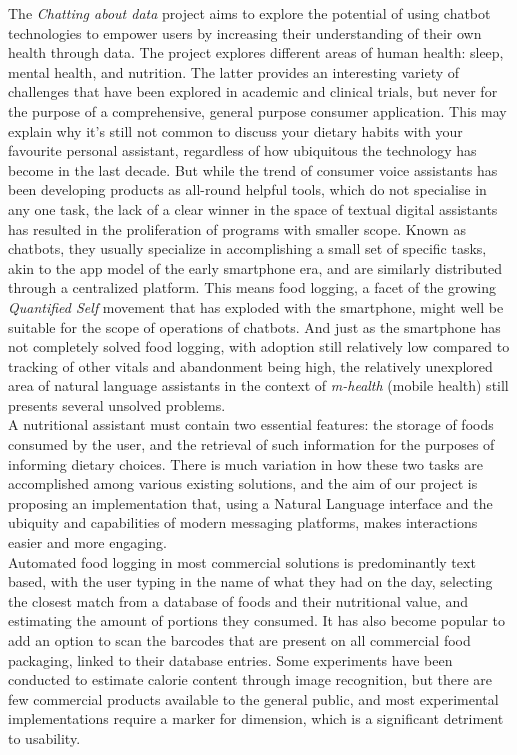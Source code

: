 The \textit{Chatting about data} project aims to explore the potential of using chatbot technologies to empower users by increasing their understanding of their own health through data. The project explores different areas of human health: sleep, mental health, and nutrition. The latter provides an interesting variety of challenges that have been explored in academic and clinical trials, but never for the purpose of a comprehensive, general purpose consumer application. This may explain why it’s still not common to discuss your dietary habits with your favourite personal assistant, regardless of how ubiquitous the technology has become in the last decade. But while the trend of consumer voice assistants has been developing products as all-round helpful tools, which do not specialise in any one task, the lack of a clear winner in the space of textual digital assistants has resulted in the proliferation of programs with smaller scope. Known as chatbots, they usually specialize in accomplishing a small set of specific tasks, akin to the app model of the early smartphone era, and are similarly distributed through a centralized platform. This means food logging, a facet of the growing \textit{Quantified Self} movement that has exploded with the smartphone, might well be suitable for the scope of operations of chatbots. And just as the smartphone has not completely solved food logging, with adoption still relatively low compared to tracking of other vitals and abandonment being high, the relatively unexplored area of natural language assistants in the context of \textit{m-health} (mobile health) still presents several unsolved problems. \\
A nutritional assistant must contain two essential features: the storage of foods consumed by the user, and the retrieval of such information for the purposes of informing dietary choices. There is much variation in how these two tasks are accomplished among various existing solutions, and the aim of our project is proposing an implementation that, using a Natural Language interface and the ubiquity and capabilities of modern messaging platforms, makes interactions easier and more engaging. \\
Automated food logging in most commercial solutions is predominantly text based, with the user typing in the name of what they had on the day, selecting the closest match from a database of foods and their nutritional value, and estimating the amount of portions they consumed. It has also become popular to add an option to scan the barcodes that are present on all commercial food packaging, linked to their database entries. Some experiments have been conducted to estimate calorie content through image recognition, but there are few commercial products available to the general public, and most experimental implementations require a marker for dimension, which is a significant detriment to usability. \\
